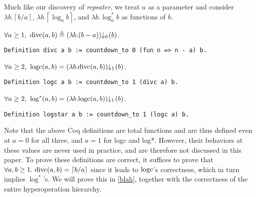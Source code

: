 Much like our discovery of \emph{repeater}, we treat $a$ as a parameter and consider $\lambda b.\left\lceil b/a \right\rceil$, $\lambda b.\left\lceil \log_ab \right\rceil$, and $\lambda b. \log^*_ab$ as functions of $b$. 
\begin{defn} \label{defn: divc}
	$\forall a \ge 1,~\divc(a, b) \triangleq \cdt{\left(\lambda b. (b-a)\right)}{0}(b)$.
\begin{lstlisting}
Definition divc a b := countdown_to 0 (fun n => n - a) b.
\end{lstlisting}\vspace*{-0.5\baselineskip}
\end{defn}
\begin{defn} \label{defn: logc}
	$\forall a\ge 2,~\logc(a, b) = \cdt{\left(\lambda b. \divc(a, b)\right)}{1}(b)$.
\begin{lstlisting}
Definition logc a b := countdown_to 1 (divc a) b.
\end{lstlisting}\vspace*{-0.5\baselineskip}
\end{defn}
\begin{defn} \label{defn: log*}
	$\forall a\ge 2,~\log^*(a, b) = \cdt{\left(\lambda b. \logc(a, b)\right)}{1}(b)$.
\begin{lstlisting}
Definition logstar a b := countdown_to 1 (logc a) b.
\end{lstlisting}\vspace*{-0.5\baselineskip}
\end{defn}
Note that the above Coq definitions are total functions and are thus defined even at $a = 0$ for all three, and $a = 1$ for logc and log*. However, their behaviors at these values are never used in practice, and are therefore not discussed in this paper. To prove these definitions are correct, it suffices to prove that
$\forall a, b \ge 1.~\text{divc}(a, b) = \left\lceil b/a \right\rceil$ since it leads to $\text{logc}$'s correctness, which in turn implies $\log^*$'s. We will prove this in \cref{blah},
together with the correctness of the entire hyperoperation hierarchy.
